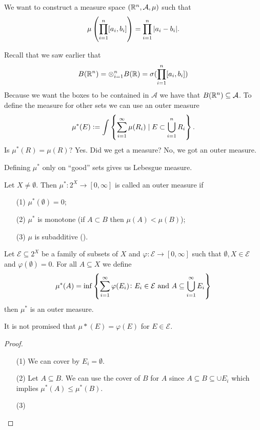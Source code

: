 \documentclass[11pt,a4paper]{article}
\newcommand{\A}{\mathcal A}
\begin{document}

We want to construct a measure space $(\R^n, \A, \mu)$ such that
\[
  \mu\del{\prod_{i=1}^{n} [a_i,b_i]} =
  \prod_{i=1}^{n} |a_i - b_i|.
\]

Recall that we saw earlier that
\[
  B(\mathbb{R}^n) =
  \otimes_{i=1}^{n} B(\mathbb{R}) =
  \sigma(\prod_{i=1}^{n} [a_i,b_i])
\]
Because we want the boxes to be contained in $\A$ we have that
$B(\R^n) \subseteq \A$.
To define the measure for other sets we can use an outer measure
\[
  \mu^*(E) := \int \set{\sum_{i=1}^{\infty} \mu(R_i) \mid E \subset 
  \bigcup_{i=1}^{n} R_i}.
\]
Is $\mu^*(R) = \mu(R)$? Yes.
Did we get a measure? No, we got an outer measure.
\begin{remark}
  Defining $\mu^*$ only on ``good'' sets gives us Lebesgue measure.
\end{remark}

\begin{definition}
  Let $X \neq \emptyset$. Then $\mu^* \colon 2^X \to [0,\infty]$ is
  called an outer measure if
  \begin{enumerate}
    \item[(1)] $\mu^*(\emptyset) = 0$;
    \item[(2)] $\mu^*$ is monotone (if $A \subset B$ then $\mu(A) < \mu(B)$);
    \item[(3)] $\mu$ is subadditive ().
  \end{enumerate}
\end{definition}

\begin{proposition}
  Let $\mathcal E \subseteq 2^X$ be a family of subsets of $X$ and
  $\varphi \colon \mathcal E \to [0,\infty]$ such that
  $\emptyset, X \in \mathcal E$ and $\varphi(\emptyset) = 0$.
  For all $A \subseteq X$ we define
  \[
    \mu^*(A) = \inf\set{\sum_{i=1}^{\infty} \varphi(E_i) \colon 
    E_i \in \mathcal E \text{ and }A \subseteq \bigcup_{i=1}^{\infty} E_i}
  \]
  then $\mu^*$ is an outer measure.
\end{proposition}
\begin{remark}
  It is not promised that $\mu*(E) = \varphi(E)$ for $E \in \mathcal E$.
\end{remark}
\begin{proof}
\begin{enumerate}
  \item[(1)] We can cover by $E_i = \emptyset$.
  \item[(2)] Let $A \subseteq B$.
    We can use the cover of $B$ for $A$ since 
    $A \subseteq B \subseteq \cup E_i$ which implies $\mu^*(A) \le \mu^*(B)$.
  \item[(3)]
\end{enumerate}
\end{proof}
\end{document}
